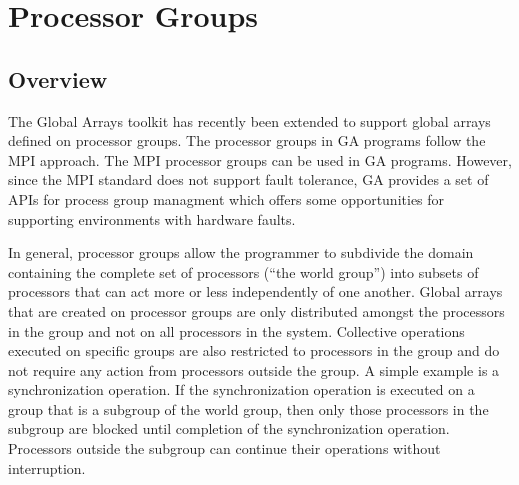 \chapter{Processor Groups}

\section{Overview}

The Global Arrays toolkit has recently been extended to support global
arrays defined on processor groups. The processor groups in GA programs
follow the MPI approach. The MPI processor groups can be used in GA
programs. However, since the MPI standard does not support fault tolerance,
GA provides a set of APIs for process group managment which offers
some opportunities for supporting environments with hardware faults.

In general, processor groups allow the programmer to subdivide the
domain containing the complete set of processors (\textquotedblleft{}the
world group\textquotedblright{}) into subsets of processors that can
act more or less independently of one another. Global arrays that
are created on processor groups are only distributed amongst the processors
in the group and not on all processors in the system. Collective operations
executed on specific groups are also restricted to processors in the
group and do not require any action from processors outside the group.
A simple example is a synchronization operation. If the synchronization
operation is executed on a group that is a subgroup of the world group,
then only those processors in the subgroup are blocked until completion
of the synchronization operation. Processors outside the subgroup
can continue their operations without interruption.

